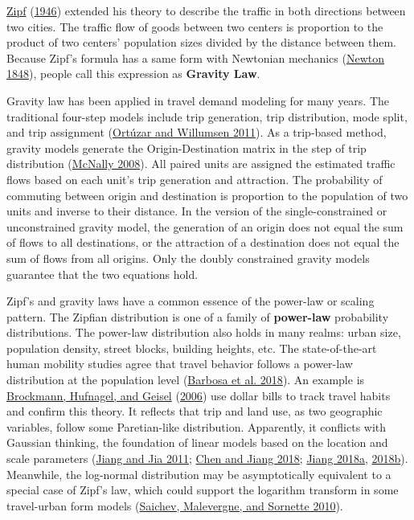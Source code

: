 \documentclass[
  12pt,
]{article}
\begin{document}
\protect\hyperlink{ref-zipfP1P2Hypothesis1946}{Zipf} (\protect\hyperlink{ref-zipfP1P2Hypothesis1946}{1946}) extended his theory to describe the traffic in both directions between two cities. The traffic flow of goods between two centers is proportion to the product of two centers' population sizes divided by the distance between them. Because Zipf's formula has a same form with Newtonian mechanics (\protect\hyperlink{ref-newton18481687}{Newton 1848}), people call this expression as \textbf{Gravity Law}.

Gravity law has been applied in travel demand modeling for many years. The traditional four-step models include trip generation, trip distribution, mode split, and trip assignment (\protect\hyperlink{ref-ortuzarModellingTransport2011}{Ortúzar and Willumsen 2011}). As a trip-based method, gravity models generate the Origin-Destination matrix in the step of trip distribution (\protect\hyperlink{ref-mcnallyFourStepModel2008}{McNally 2008}). All paired units are assigned the estimated traffic flows based on each unit's trip generation and attraction. The probability of commuting between origin and destination is proportion to the population of two units and inverse to their distance. In the version of the single-constrained or unconstrained gravity model, the generation of an origin does not equal the sum of flows to all destinations, or the attraction of a destination does not equal the sum of flows from all origins. Only the doubly constrained gravity models guarantee that the two equations hold.

Zipf's and gravity laws have a common essence of the power-law or scaling pattern. The Zipfian distribution is one of a family of \textbf{power-law} probability distributions. The power-law distribution also holds in many realms: urban size, population density, street blocks, building heights, etc. The state-of-the-art human mobility studies agree that travel behavior follows a power-law distribution at the population level (\protect\hyperlink{ref-barbosaHumanMobilityModels2018}{Barbosa et al. 2018}). An example is \protect\hyperlink{ref-brockmannScalingLawsHuman2006}{Brockmann, Hufnagel, and Geisel} (\protect\hyperlink{ref-brockmannScalingLawsHuman2006}{2006}) use dollar bills to track travel habits and confirm this theory. It reflects that trip and land use, as two geographic variables, follow some Paretian-like distribution. Apparently, it conflicts with Gaussian thinking, the foundation of linear models based on the location and scale parameters (\protect\hyperlink{ref-jiangZipfLawAll2011}{Jiang and Jia 2011}; \protect\hyperlink{ref-chenHierarchicalScalingSystems2018}{Chen and Jiang 2018}; \protect\hyperlink{ref-jiangGeospatialAnalysisRequires2018}{Jiang 2018a}, \protect\hyperlink{ref-jiangSpatialHeterogeneityScale2018}{2018b}). Meanwhile, the log-normal distribution may be asymptotically equivalent to a special case of Zipf's law, which could support the logarithm transform in some travel-urban form models (\protect\hyperlink{ref-saichevTheoryZipfLaw2010}{Saichev, Malevergne, and Sornette 2010}).
\end{document}
